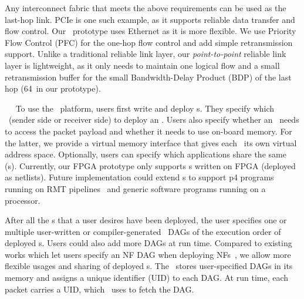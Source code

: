 Any interconnect fabric that meets the above requirements can be used as the last-hop link.
PCIe is one such example, as it supports reliable data transfer and flow control.
Our \snic\ prototype uses Ethernet as it is more flexible.
We use Priority Flow Control (PFC) for the one-hop flow control and add simple retransmission support.
Unlike a traditional reliable link layer, our {\em point-to-point} reliable link layer is lightweight, %
as it only needs to maintain one logical flow and a small retransmission buffer for the small Bandwidth-Delay Product (BDP) of the last hop (64\KB\ in our prototype).

~~
To use the \snic\ platform, users first write and deploy \nt{}s.
They specify which \snic\ (sender side or receiver side) to deploy an \nt.
Users also specify whether an \nt\ needs to access the packet payload and whether it needs to use on-board memory.
For the latter, we provide a virtual memory interface that gives each \nt\ its own virtual address space.
Optionally, users can specify which applications share the same \nt{}(s).
Currently, our FPGA prototype only supports \nt{}s written on FPGA (deployed as netlists).
Future implementation could extend \snic{}s to support p4 programs running on RMT pipelines~\cite{p4fpga-sosr17} and generic software programs running on a processor.

After all the \nt{}s that a user desires have been deployed, the user specifies one or multiple user-written or compiler-generated~\cite{clicknp-sigcomm16,NFP-sigcomm17} DAGs of the execution order of deployed \nt{}s. Users could also add more DAGs at run time. Compared to existing works which let users specify an NF DAG when deploying NFs~\cite{e2-sosp15,flowtags-nsdi14,clicknp-sigcomm16}, we allow more flexible usages and sharing of deployed \nt{}s. %
The \snic\ stores user-specified DAGs in its memory and assigns a unique identifier (UID) to each DAG.
At run time, each packet carries a UID, which \snic\ uses to fetch the DAG.